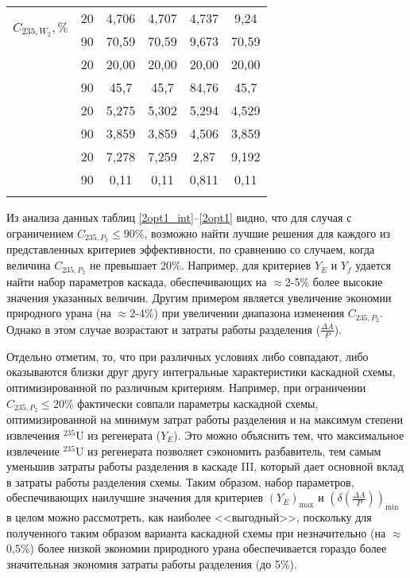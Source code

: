 \begin{table}[ht]
\begin{tabular}{|r|r||c|c|c|c|}
        \multirow{2}{*}{$C_{235,W_{2}}, \%$}
            & 20 & 4,706 & 4,707 & 4,737 & 9,24 \\\cline{2-6} 
            & 90 & 70,59 & 70,59 & 9,673 & 70,59\\
    \Xhline{2\arrayrulewidth}
        \multirow{2}{*}{$C_{235,P_{2}}, \%$}
            & 20 & 20,00 & 20,00 & 20,00 & 20,00 \\\cline{2-6} 
            & 90 & 45,7 & 45,7 & 84,76 & 45,7\\
        \Xhline{2\arrayrulewidth}
        \multirow{2}{*}{$C_{235,P_{n}}, \%$}
            & 20 & 5,275 & 5,302 & 5,294 & 4,529 \\\cline{2-6} 
            & 90 & 3,859 & 3,859 & 4,506 & 3,859\\
        \Xhline{2\arrayrulewidth}           
        \multirow{2}{*}{$P_2$, кг}
            & 20 & 7,278 & 7,259 & 2,87 & 9,192 \\\cline{2-6} 
            & 90 & 0,11 & 0,11 & 0,811 & 0,11\\
\Xhline{2\arrayrulewidth}
        \end{tabular}
\end{table}

Из анализа данных таблиц \ref{2opt1_int}--\ref{2opt1} видно, что для случая с ограничением $C_{235,{P_2}} \leq 90\%$, возможно найти лучшие решения для каждого из представленных критериев эффективности, по сравнению со случаем, когда величина $C_{235,{P_2}}$ не превышает 20\%. Например, для критериев $Y_E$ и $Y_f$ удается найти набор параметров каскада, обеспечивающих на $\approx$2-5\% более высокие значения указанных величин. Другим примером является увеличение экономии природного урана (на $\approx$2-4\%) при увеличении диапазона изменения $C_{235,{P_2}}$. Однако в этом случае возрастают и затраты работы разделения ($\frac{\Delta A}{P}$).

Отдельно отметим, то, что при различных условиях либо совпадают, либо оказываются близки друг другу интегральные характеристики каскадной схемы, оптимизированной по различным критериям. Например, при ограничении $C_{235,{P_2}} \leq 20\%$ фактически совпали параметры каскадной схемы, оптимизированной на минимум затрат работы разделения и на максимум степени извлечения $^{235}$U из регенерата ($Y_E$). Это можно объяснить тем, что максимальное извлечение $^{235}$U из регенерата позволяет сэкономить разбавитель, тем самым уменьшив затраты работы разделения в каскаде III, который дает основной вклад в затраты работы разделения схемы. Таким образом, набор параметров, обеспечивающих наилучшие значения для критериев $(Y_{E})_\text{max}$ и $(\delta(\frac{\Delta A}{P}))_\text{min}$ в целом можно рассмотреть, как наиболее <<выгодный>>, поскольку для полученного таким образом варианта каскадной схемы при незначительно (на $\approx$0,5\%) более низкой экономии природного урана обеспечивается гораздо более значительная экономия затраты работы разделения (до 5\%). 


